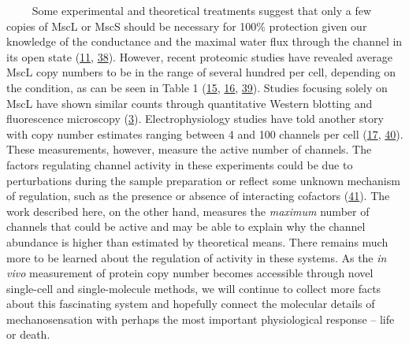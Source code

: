 ~~~~
Some
experimental
and
theoretical
treatments
suggest
that
only a
few
copies
of
MscL
or
MscS
should
be
necessary
for
100\%
protection
given
our
knowledge
of the
conductance
and
the
maximal
water
flux
through
the
channel
in its
open
state
(\protect\hyperlink{ref-louhivuori2010}{11},
\protect\hyperlink{ref-booth2014}{38}).
However,
recent
proteomic
studies
have
revealed
average
MscL
copy
numbers
to be
in the
range
of
several
hundred
per
cell,
depending
on the
condition,
as can
be
seen
in
Table
1
(\protect\hyperlink{ref-schmidt2016}{15},
\protect\hyperlink{ref-soufi2015}{16},
\protect\hyperlink{ref-li2014}{39}).
Studies
focusing
solely
on
MscL
have
shown
similar
counts
through
quantitative
Western
blotting
and
fluorescence
microscopy
(\protect\hyperlink{ref-bialecka-fornal2012}{3}).
Electrophysiology
studies
have
told
another
story
with
copy
number
estimates
ranging
between
4 and
100
channels
per
cell
(\protect\hyperlink{ref-stokes2003a}{17},
\protect\hyperlink{ref-blount1999}{40}).
These
measurements,
however,
measure
the
active
number
of
channels.
The
factors
regulating
channel
activity
in
these
experiments
could
be due
to
perturbations
during
the
sample
preparation
or
reflect
some
unknown
mechanism
of
regulation,
such
as the
presence
or
absence
of
interacting
cofactors
(\protect\hyperlink{ref-schumann2010}{41}).
The
work
described
here,
on the
other
hand,
measures
the
\emph{maximum}
number
of
channels
that
could
be
active
and
may be
able
to
explain
why
the
channel
abundance
is
higher
than
estimated
by
theoretical
means.
There
remains
much
more
to be
learned
about
the
regulation
of
activity
in
these
systems.
As the
\emph{in
vivo}
measurement
of
protein
copy
number
becomes
accessible
through
novel
single-cell
and
single-molecule
methods,
we
will
continue
to
collect
more
facts
about
this
fascinating
system
and
hopefully
connect
the
molecular
details
of
mechanosensation
with
perhaps
the
most
important
physiological
response
--
life
or
death.

